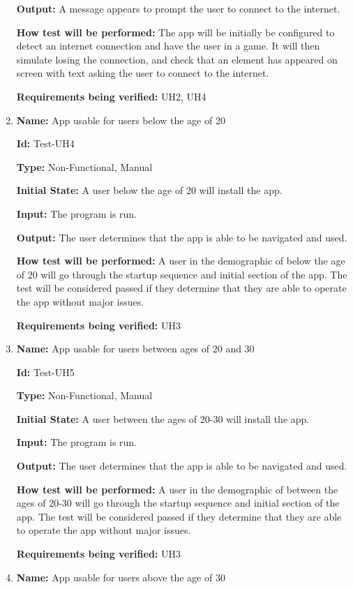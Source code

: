 \documentclass[12pt, titlepage]{article}
\begin{document}
\begin{enumerate}
\textbf{Output:} A message appears to prompt the user to connect to the internet. 
					
\textbf{How test will be performed:} The app will be initially be configured to detect an internet connection and have the user in a game. It will then simulate losing the connection, and check that an element has appeared on screen with text asking the user to connect to the internet. 

\textbf{Requirements being verified:} UH2, UH4

\item{\textbf{Name:} App usable for users below the age of 20}

\textbf{Id:} Test-UH4

\textbf{Type:} Non-Functional, Manual
					
\textbf{Initial State:} A user below the age of 20 will install the app.
					
\textbf{Input:} The program is run.
					
\textbf{Output:} The user determines that the app is able to be navigated and used.
					
\textbf{How test will be performed:} A user in the demographic of below the age of 20 will go through the startup sequence and initial section of the app. The test will be considered passed if they determine that they are able to operate the app without major issues. 

\textbf{Requirements being verified:} UH3

\item{\textbf{Name:} App usable for users between ages of 20 and 30}

\textbf{Id:} Test-UH5

\textbf{Type:} Non-Functional, Manual
					
\textbf{Initial State:} A user between the ages of 20-30 will install the app.
					
\textbf{Input:} The program is run.
					
\textbf{Output:} The user determines that the app is able to be navigated and used.
					
\textbf{How test will be performed:} A user in the demographic of between the ages of 20-30 will go through the startup sequence and initial section of the app. The test will be considered passed if they determine that they are able to operate the app without major issues. 

\textbf{Requirements being verified:} UH3

\item{\textbf{Name:} App usable for users above the age of 30}


\end{enumerate}
\end{document}
